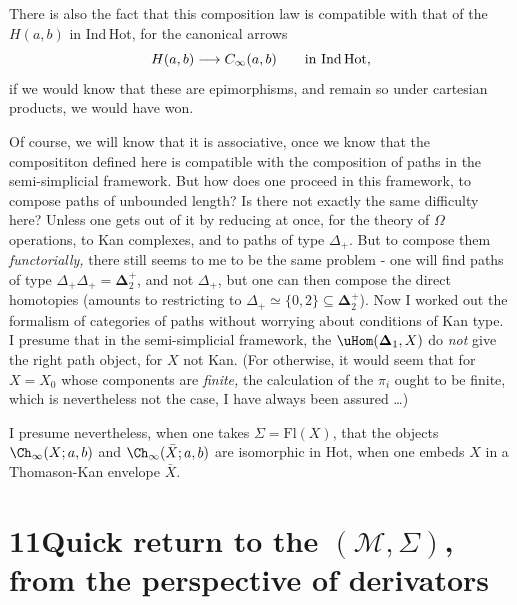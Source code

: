 \clearpage
{}

There is also the fact that this composition law is compatible with that of the $H(a,b)$ in Ind\,Hot, for the canonical arrows
\[ H(a,b)\longrightarrow C_\infty(a,b) \qquad \text{in Ind\,Hot}, \]
if we would know that these are epimorphisms, and remain so under cartesian products, we would have won.

Of course, we will know that it is associative, once we know that the composititon defined here is compatible with the composition of paths in the semi-simplicial framework. But how does one proceed in this framework, to compose paths of unbounded length? Is there not exactly the same difficulty here? Unless one gets %
out of it by reducing at once, for the theory of $\Omega$ operations, to Kan complexes, and to paths of type $\Delta_+$. But to compose them \textit{functorially,} there still seems to me to be the same problem - one will find paths of type $\Delta_+\Delta_+ = \boldsymbol{\Delta}_2^+$, and not $\Delta_+$, but one can then compose the direct homotopies (amounts to restricting to $\Delta_+\simeq\{0,2\}\subseteq\boldsymbol{\Delta}_2^+$). Now I worked out the formalism of categories of paths without worrying about conditions of Kan type. I presume that in the semi-simplicial framework, the $\uHom(\boldsymbol{\Delta}_1,X)$ do \textit{not} give the right path object, for $X$ not Kan. (For otherwise, it would seem that for $X=X_0$ whose components are \textit{finite,} the calculation of the $\pi_i$ ought to be finite, which is nevertheless not the case, I have always been assured \dots)

I presume nevertheless, when one takes $\Sigma=\mathrm{Fl}(X)$, that the objects $\Ch_\infty(X;a,b)$ and $\Ch_\infty(\bar{X};a,b)$ are isomorphic in Hot, when one embeds $X$ in a Thomason-Kan envelope $\bar{X}$.

\clearpage
{}


\section*{11\quad Quick return to the $(\mathcal{M},\Sigma)$, from the perspective of derivators}


